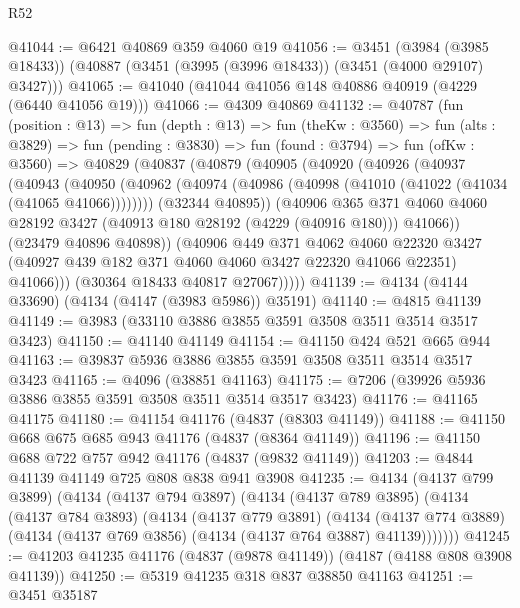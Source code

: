 \begin{lexlean}{R52}
\begin{coremodule}
@41044 := @6421 @40869 @359 @4060 @19
@41056 := @3451
    (@3984 (@3985 @18433))
    (@40887 (@3451 (@3995 (@3996 @18433)) (@3451 (@4000 @29107) @3427)))
@41065 := @41040 (@41044 @41056 @148 @40886 @40919 (@4229 (@6440 @41056 @19)))
@41066 := @4309 @40869
@41132 := @40787
    (fun (position : @13) =>
    fun (depth : @13) =>
    fun (theKw : @3560) =>
    fun (alts : @3829) =>
    fun (pending : @3830) =>
    fun (found : @3794) =>
    fun (ofKw : @3560) =>
    @40829
      (@40837
        (@40879
          (@40905
            (@40920
              (@40926
                (@40937
                  (@40943
                    (@40950
                      (@40962 (@40974 (@40986 (@40998 (@41010 (@41022 (@41034 (@41065 @41066))))))))
                      (@32344 @40895))
                    (@40906
                      @365
                      @371
                      @4060
                      @4060
                      @28192
                      @3427
                      (@40913 @180 @28192 (@4229 (@40916 @180)))
                      @41066))
                  (@23479 @40896 @40898))
                (@40906
                  @449
                  @371
                  @4062
                  @4060
                  @22320
                  @3427
                  (@40927 @439 @182 @371 @4060 @4060 @3427 @22320 @41066 @22351)
                  @41066)))
            (@30364 @18433 @40817 @27067)))))
@41139 := @4134 (@4144 @33690) (@4134 (@4147 (@3983 @5986)) @35191)
@41140 := @4815 @41139
@41149 := @3983 (@33110 @3886 @3855 @3591 @3508 @3511 @3514 @3517 @3423)
@41150 := @41140 @41149
@41154 := @41150 @424 @521 @665 @944
@41163 := @39837 @5936 @3886 @3855 @3591 @3508 @3511 @3514 @3517 @3423
@41165 := @4096 (@38851 @41163)
@41175 := @7206 (@39926 @5936 @3886 @3855 @3591 @3508 @3511 @3514 @3517 @3423)
@41176 := @41165 @41175
@41180 := @41154 @41176 (@4837 (@8303 @41149))
@41188 := @41150 @668 @675 @685 @943 @41176 (@4837 (@8364 @41149))
@41196 := @41150 @688 @722 @757 @942 @41176 (@4837 (@9832 @41149))
@41203 := @4844 @41139 @41149 @725 @808 @838 @941 @3908
@41235 := @4134
    (@4137 @799 @3899)
    (@4134
      (@4137 @794 @3897)
      (@4134
        (@4137 @789 @3895)
        (@4134
          (@4137 @784 @3893)
          (@4134
            (@4137 @779 @3891)
            (@4134
              (@4137 @774 @3889)
              (@4134 (@4137 @769 @3856) (@4134 (@4137 @764 @3887) @41139)))))))
@41245 := @41203 @41235 @41176 (@4837 (@9878 @41149)) (@4187 (@4188 @808 @3908 @41139))
@41250 := @5319 @41235 @318 @837 @38850 @41163
@41251 := @3451 @35187

\end{coremodule}
\end{lexlean}
